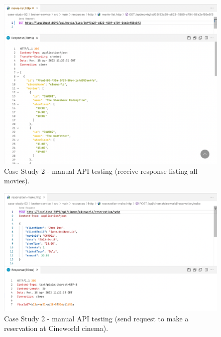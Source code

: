 \begin{figure}[H]
  \centering
  \includegraphics[width=1.0\linewidth]{./assets/images/case-study-02/cs02-manual-2.png}
  \caption{Case Study 2 - manual API testing (receive response listing all movies).}
  \label{fig:cs02-manual-2}
\end{figure}

\begin{figure}[H]
  \centering
  \includegraphics[width=1.0\linewidth]{./assets/images/case-study-02/cs02-manual-3.png}
  \caption{Case Study 2 - manual API testing (send request to make a reservation at Cineworld cinema).}
  \label{fig:cs02-manual-3}
\end{figure}

